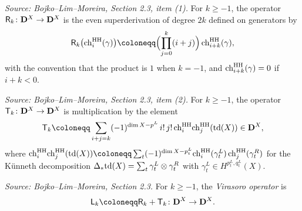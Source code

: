 \begin{definition}[VirasoroOpR]
  \label{def:virasoro-R}
  \textit{Source: Bojko--Lim--Moreira, Section 2.3, item (1).}
  For \(k \geq -1\), the operator \(\mathsf{R}_k \colon \mathbf{D}^X \to \mathbf{D}^X\) is the even
  superderivation of degree \(2k\) defined on generators by
  \[\bR_k\bigl(\chh_i(\gamma)\bigr) \coloneqq
    \Bigl(\prod_{j=0}^k (i+j)\Bigr)\, \chh_{i+k}(\gamma),\]
  with the convention that the product is \(1\) when \(k = -1\), and
  \(\mathrm{ch}^{\mathrm{HH}}_{i+k}(\gamma) = 0\) if \(i+k < 0\).
\end{definition}

\begin{definition}[VirasoroOpT]
  \label{def:virasoro-T}
  \textit{Source: Bojko--Lim--Moreira, Section 2.3, item (2).}
  For \(k \geq -1\), the operator \(\mathsf{T}_k \colon \mathbf{D}^X \to \mathbf{D}^X\) is
  multiplication by the element
  \[\bT_k \coloneqq \sum_{i+j=k} (-1)^{\dim X - p^L}\, i!\, j!\,
    \chh_i \chh_j(\tdX) \in \BD^X,\]
  where \(\chh_i \chh_j(\tdX) \coloneqq \sum_t (-1)^{\dim X - p_t^L}
  \chh_i(\gamma_t^L)\, \chh_j(\gamma_t^R)\) for the Künneth decomposition
  \(\Delta_* \mathrm{td}(X) = \sum_t \gamma_t^L \otimes \gamma_t^R\) with
  \(\gamma_t^L \in H^{p_t^L, q_t^L}(X)\).
\end{definition}

\begin{definition}[VirasoroOp]
  \label{def:virasoro-op}
  \textit{Source: Bojko--Lim--Moreira, Section 2.3.}
  For \(k \geq -1\), the \emph{Virasoro operator} is
  \[\bL_k \coloneqq \bR_k + \bT_k \colon \BD^X \to \BD^X.\]
\end{definition}



